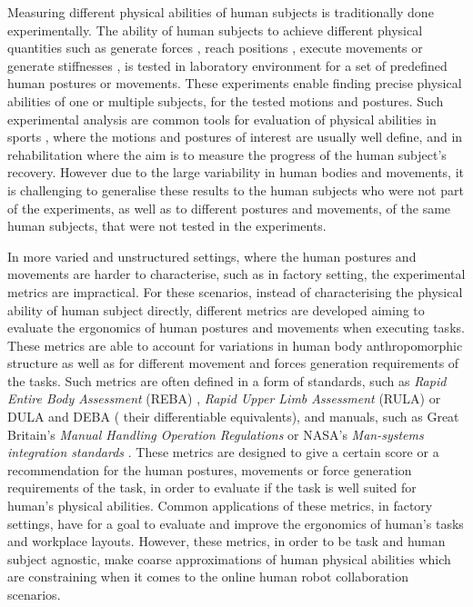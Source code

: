 Measuring different physical abilities of human subjects is traditionally done experimentally. The ability of human subjects to achieve different physical quantities such as generate forces \cite{HODDER2016Testing,HOLZBAUR20072442}, reach positions \cite{CASTRO2019108}, execute movements \cite{Jessop2016} or generate stiffnesses \cite{Tsuji1995,Artemiadis2010}, is tested in laboratory environment for a set of predefined human postures or movements. These experiments enable finding precise physical abilities of one or multiple subjects, for the tested motions and postures.  Such experimental analysis are common tools for evaluation of physical abilities in sports \cite{Jessop2016}, where the motions and postures of interest are usually well define, and in rehabilitation \cite{HAISMA2006741} where the aim is to measure the progress of the human subject's recovery. However due to the large variability in human bodies and movements, it is challenging to generalise these results to the human subjects who were not part of the experiments, as well as to different postures and movements, of the same human subjects, that were not tested in the experiments.

In more varied and unstructured settings, where the human postures and movements are harder to characterise, such as in factory setting, the experimental metrics are impractical. For these scenarios, instead of characterising the physical ability of human subject directly, different metrics are developed aiming to evaluate the ergonomics of human postures and movements when executing tasks. These metrics are able to account for variations in human body anthropomorphic structure as well as for different movement and forces generation requirements of the tasks. Such metrics are often defined in a form of standards, such as \textit{Rapid Entire Body Assessment} (REBA) \cite{reba}, \textit{Rapid Upper Limb Assessment} (RULA) \cite{rula} or DULA and DEBA \cite{Yazdani2022} ( their differentiable equivalents), and manuals, such as Great Britain's \textit{Manual Handling Operation Regulations} \cite{health1992manual} or NASA's \textit{Man-systems integration standards} \cite{nasa}. These metrics are designed to give a certain score or a recommendation for the human postures, movements or force generation requirements of the task, in order to evaluate if the task is well suited for human's physical abilities. Common applications of these metrics, in factory settings, have for a goal to evaluate and improve the ergonomics of human's tasks \cite{Busch2017} and workplace layouts\cite{ORE20161, Lietaert2019}. However, these metrics, in order to be task and human subject agnostic, make coarse approximations of human physical abilities which are constraining when it comes to the online human robot collaboration scenarios\cite{maurice2015}. 

